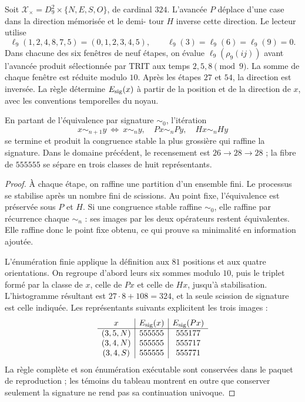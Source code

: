 \begin{definition}
\label{viii:def:firma555}
Soit \(\mathcal X_\times=D_9^2\times\{N,E,S,O\}\), de cardinal \(324\).
L'avancée \(P\) déplace d'une case dans la direction mémorisée et le demi-
tour \(H\) inverse cette direction. Le lecteur utilise
\[
\ell_9(1,2,4,8,7,5)=(0,1,2,3,4,5),\qquad
\ell_9(3)=\ell_9(6)=\ell_9(9)=0.
\]
Dans chacune des six fenêtres de neuf étapes, on évalue
\(\ell_9(\rho_9(ij))\) avant l'avancée produit sélectionnée par TRIT aux
temps \(2,5,8\pmod9\). La somme de chaque fenêtre est réduite modulo
\(10\). Après les étapes \(27\) et \(54\), la direction est inversée.
La règle détermine \(E_{\rm sig}(x)\) à partir de la position et de la direction
de \(x\), avec les conventions temporelles du noyau.
\end{definition}

\begin{proposition}
\label{viii:prop:firma555}
En partant de l'équivalence par signature \(\sim_0\), l'itération
\[
x\sim_{n+1}y\ \Longleftrightarrow\
x\sim_n y,\quad Px\sim_n Py,\quad Hx\sim_n Hy
\]
se termine et produit la congruence stable la plus grossière qui raffine la signature. Dans le domaine précédent, le recensement est \(26\to28\to28\) ; la fibre de \(555555\) se sépare en trois classes de huit représentants.
\end{proposition}
\begin{proof}
À chaque étape, on raffine une partition d'un ensemble fini. Le processus se
stabilise après un nombre fini de scissions. Au point fixe,
l'équivalence est préservée sous \(P\) et \(H\). Si une congruence stable
raffine \(\sim_0\), elle raffine par récurrence chaque \(\sim_n\) : ses images
par les deux opérateurs restent équivalentes. Elle raffine donc le point
fixe obtenu, ce qui prouve sa minimalité en information ajoutée.

L'énumération finie applique la définition aux \(81\) positions et aux quatre orientations. On regroupe d'abord leurs six sommes modulo \(10\), puis le triplet formé par la classe de \(x\), celle de \(Px\) et celle de \(Hx\), jusqu'à stabilisation. L'histogramme résultant est \(27\cdot8+108=324\), et la seule scission de signature est celle indiquée. Les représentants suivants explicitent les trois images :
\[
\begin{array}{c|c|c}
x&E_{\rm sig}(x)&E_{\rm sig}(Px)\\\hline
(3,5,N)&555555&555177\\
(3,4,N)&555555&555717\\
(3,4,S)&555555&555771
\end{array}
\]
La règle complète et son énumération exécutable sont conservées dans le paquet
de reproduction ; les témoins du tableau montrent en outre que conserver
seulement la signature ne rend pas sa continuation univoque.
\end{proof}

